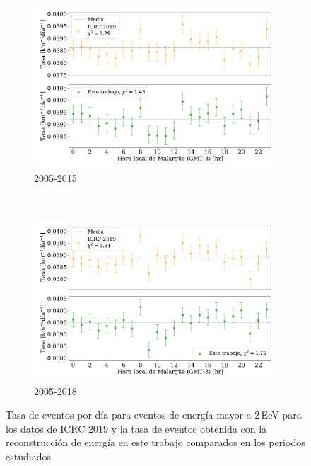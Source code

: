    \begin{figure}[H]
       \centering
           \begin{subfigure}[b]{0.8\textwidth}
           \includegraphics[width=\textwidth]{Graphs/rate_hour_of_the_day/2EeV_ICRC_2019_S38_S1000_expected.pdf}
           \caption{2005-2015} \label{fig:2EeV_expected}
           \end{subfigure}\\
           \begin{subfigure}[b]{0.8\textwidth}
           \includegraphics[width=\textwidth]{Graphs/rate_hour_of_the_day/2EeV_ICRC_2019_S38_S1000_expected_05_18.pdf}
           \caption{2005-2018}\label{fig:2EeV_expected_05_18}
           \end{subfigure}%
           \caption{Tasa de eventos por día para eventos de energía mayor a 2\,EeV para los datos de ICRC 2019 y la tasa de eventos obtenida con la reconstrucción de energía en este trabajo comparados en los periodos estudiados}\label{final}
   \end{figure}
